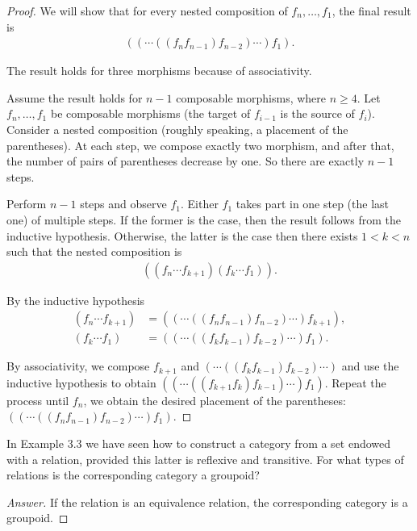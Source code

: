 \begin{proof}
	We will show that for every nested composition of $f_{n}, \ldots, f_{1}$, the final result is
	\begin{align*}
		((\cdots ((f_{n}f_{n-1})f_{n-2})\cdots)f_{1}).
	\end{align*}

	The result holds for three morphisms because of associativity.

	Assume the result holds for $n - 1$ composable morphisms, where $n\geq 4$. Let $f_{n}, \ldots, f_{1}$ be composable morphisms (the target of $f_{i-1}$ is the source of $f_{i}$). Consider a nested composition (roughly speaking, a placement of the parentheses). At each step, we compose exactly two morphism, and after that, the number of pairs of parentheses decrease by one. So there are exactly $n - 1$ steps.

	Perform $n - 1$ steps and observe $f_{1}$. Either $f_{1}$ takes part in one step (the last one) of multiple steps. If the former is the case, then the result follows from the inductive hypothesis. Otherwise, the latter is the case then there exists $1 < k < n$ such that the nested composition is
	\begin{align*}
		((f_{n}\cdots f_{k+1})(f_{k}\cdots f_{1})).
	\end{align*}

	By the inductive hypothesis
	\begin{align*}
		(f_{n}\cdots f_{k+1}) & = ((\cdots ((f_{n}f_{n-1})f_{n-2})\cdots)f_{k+1}), \\
		(f_{k}\cdots f_{1})   & = ((\cdots ((f_{k}f_{k-1})f_{k-2})\cdots)f_{1}).
	\end{align*}

	By associativity, we compose $f_{k+1}$ and $(\cdots ((f_{k}f_{k-1})f_{k-2})\cdots)$ and use the inductive hypothesis to obtain $((\cdots ((f_{k+1}f_{k})f_{k-1})\cdots)f_{1})$. Repeat the process until $f_{n}$, we obtain the desired placement of the parentheses: $((\cdots ((f_{n}f_{n-1})f_{n-2})\cdots)f_{1})$.
\end{proof}

\begin{exercise}{4.2}
	In Example 3.3 we have seen how to construct a category from a set endowed with a relation, provided this latter is reflexive and transitive. For what types of relations is the corresponding category a groupoid?
\end{exercise}

\begin{proof}[Answer]
	If the relation is an equivalence relation, the corresponding category is a groupoid.
\end{proof}

